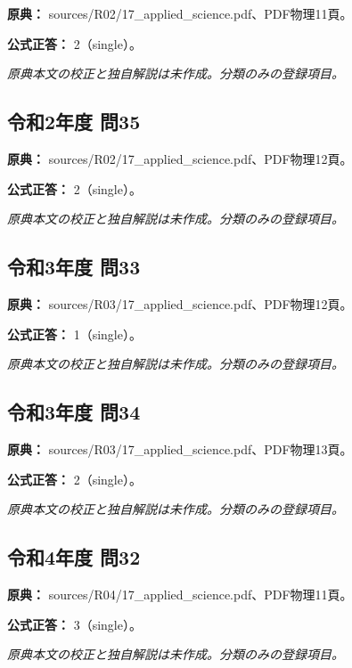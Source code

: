 \noindent\textbf{原典：} sources/R02/17\_applied\_science.pdf、PDF物理11頁。

\textbf{公式正答：} 2（single）。

\par\textit{原典本文の校正と独自解説は未作成。分類のみの登録項目。}

\subsection{令和2年度 問35}
\label{q:r02-reg-applied-35}

\noindent\textbf{原典：} sources/R02/17\_applied\_science.pdf、PDF物理12頁。

\textbf{公式正答：} 2（single）。

\par\textit{原典本文の校正と独自解説は未作成。分類のみの登録項目。}

\subsection{令和3年度 問33}
\label{q:r03-reg-applied-33}

\noindent\textbf{原典：} sources/R03/17\_applied\_science.pdf、PDF物理12頁。

\textbf{公式正答：} 1（single）。

\par\textit{原典本文の校正と独自解説は未作成。分類のみの登録項目。}

\subsection{令和3年度 問34}
\label{q:r03-reg-applied-34}

\noindent\textbf{原典：} sources/R03/17\_applied\_science.pdf、PDF物理13頁。

\textbf{公式正答：} 2（single）。

\par\textit{原典本文の校正と独自解説は未作成。分類のみの登録項目。}

\subsection{令和4年度 問32}
\label{q:r04-reg-applied-32}

\noindent\textbf{原典：} sources/R04/17\_applied\_science.pdf、PDF物理11頁。

\textbf{公式正答：} 3（single）。

\par\textit{原典本文の校正と独自解説は未作成。分類のみの登録項目。}

